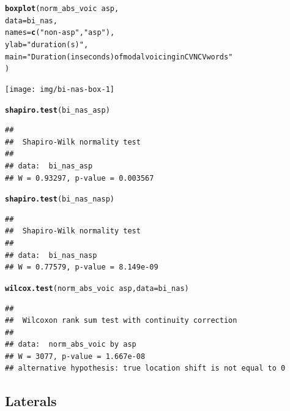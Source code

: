 \documentclass[a4paper,11pt]{article}\usepackage[]{graphicx}\usepackage[]{color}
\makeatletter
\newcommand{\hlstr}[1]{\textcolor[rgb]{0.192,0.494,0.8}{#1}}%
\newcommand{\hlopt}[1]{\textcolor[rgb]{0,0,0}{#1}}%
\newcommand{\hlstd}[1]{\textcolor[rgb]{0.345,0.345,0.345}{#1}}%
\newcommand{\hlkwc}[1]{\textcolor[rgb]{0.333,0.667,0.333}{#1}}%
\newcommand{\hlkwd}[1]{\textcolor[rgb]{0.737,0.353,0.396}{\textbf{#1}}}%
\newenvironment{kframe}{%
 \def\at@end@of@kframe{}%
 \ifinner\ifhmode%
  \def\at@end@of@kframe{\end{minipage}}%
  \begin{minipage}{\columnwidth}%
 \fi\fi%
 \def\FrameCommand##1{\hskip\@totalleftmargin \hskip-\fboxsep
 \colorbox{shadecolor}{##1}\hskip-\fboxsep
     \hskip-\linewidth \hskip-\@totalleftmargin \hskip\columnwidth}%
 \MakeFramed {\advance\hsize-\width
   \@totalleftmargin\z@ \linewidth\hsize
   \@setminipage}}%
 {\par\unskip\endMakeFramed%
 \at@end@of@kframe}
\newenvironment{knitrout}{}{} %
\makeatother
\begin{document}
\begin{knitrout}
\color{fgcolor}\begin{kframe}
\begin{alltt}
\hlkwd{boxplot}\hlstd{(norm_abs_voic} \hlopt{~} \hlstd{asp,}
        \hlkwc{data} \hlstd{= bi_nas,}
        \hlkwc{names} \hlstd{=} \hlkwd{c}\hlstd{(}\hlstr{"non-asp"}\hlstd{,} \hlstr{"asp"}\hlstd{),}
        \hlkwc{ylab} \hlstd{=} \hlstr{"duration (s)"}\hlstd{,}
        \hlkwc{main} \hlstd{=} \hlstr{"Duration (in seconds) of modal voicing in CVNCV words"}
        \hlstd{)}
\end{alltt}
\end{kframe}

{\centering \texttt{[image: img/bi-nas-box-1]} 

}



\end{knitrout}

\begin{knitrout}
\color{fgcolor}\begin{kframe}
\begin{alltt}
\hlkwd{shapiro.test}\hlstd{(bi_nas_asp)}
\end{alltt}
\begin{verbatim}
## 
## 	Shapiro-Wilk normality test
## 
## data:  bi_nas_asp
## W = 0.93297, p-value = 0.003567
\end{verbatim}
\begin{alltt}
\hlkwd{shapiro.test}\hlstd{(bi_nas_nasp)}
\end{alltt}
\begin{verbatim}
## 
## 	Shapiro-Wilk normality test
## 
## data:  bi_nas_nasp
## W = 0.77579, p-value = 8.149e-09
\end{verbatim}
\begin{alltt}
\hlkwd{wilcox.test}\hlstd{(norm_abs_voic} \hlopt{~} \hlstd{asp,} \hlkwc{data} \hlstd{= bi_nas)}
\end{alltt}
\begin{verbatim}
## 
## 	Wilcoxon rank sum test with continuity correction
## 
## data:  norm_abs_voic by asp
## W = 3077, p-value = 1.667e-08
## alternative hypothesis: true location shift is not equal to 0
\end{verbatim}
\end{kframe}
\end{knitrout}

\subsection{Laterals}
\end{document}
